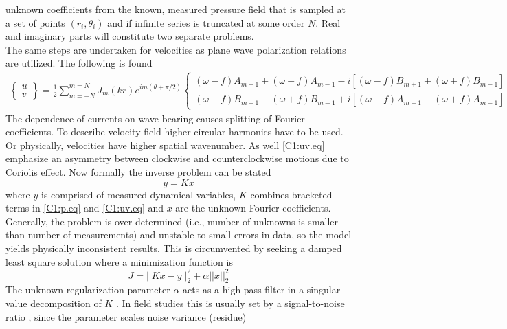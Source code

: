 \documentclass[12pt]{article}
\begin{document}
unknown coefficients from the known, measured pressure field that is sampled at a set of points 
$(r_i, \theta_i)$ and if infinite series is truncated at some order $N$. Real and imaginary parts 
will constitute two separate problems.\\
The same steps are undertaken for velocities as plane wave polarization relations 
\citep[e.g.,][]{muller2000scattering} are utilized. The following is found
\begin{align}
\label{C1:uv.eq}
\begin{Bmatrix}
u \\ v
\end{Bmatrix}
= \frac{1}{2} \sum_{m = -N}^{m = N} J_{m} (kr) e^{im(\theta + \pi/2)}
\begin{Bmatrix}
(\omega - f) A_{m + 1} + (\omega + f) A_{m - 1} - i [(\omega - f) B_{m + 1} + (\omega + f) B_{m - 
	1}] \\ 
(\omega - f) B_{m + 1} - (\omega + f) B_{m - 1} + i [ (\omega - f) A_{m + 1} - (\omega + f) A_{m - 
	1}]
\end{Bmatrix}
\end{align}
The dependence of currents on wave bearing causes splitting of Fourier coefficients. To describe 
velocity field higher circular harmonics have to be used. Or physically, velocities have higher 
spatial wavenumber. As well \eqref{C1:uv.eq} emphasize an asymmetry between clockwise 
and counterclockwise motions due to Coriolis effect. Now formally the inverse problem can be stated 
\begin{equation}
y = K x
\end{equation}
where $y$ is comprised of measured dynamical variables, $K$ combines bracketed terms in 
\eqref{C1:p.eq} and \eqref{C1:uv.eq} and $x$ are the unknown Fourier coefficients. Generally, the 
problem is over-determined (i.e., number of unknowns is smaller than number of 
measurements) and unstable to small errors in data, so the model yields physically inconsistent 
results. This is circumvented by seeking a damped least square solution \citep{munk2009ocean} where 
a minimization function is 
\begin{equation}
\label{C1:Tikh_prob}
J = ||K x - y||^2_2 + \alpha ||x||^2_2
\end{equation}
The unknown regularization parameter $\alpha$ acts as a high-pass filter in a singular value 
decomposition of $K$ \citep{bennett1992inverse}. In field studies this is usually set by a 
signal-to-noise ratio \citep{munk2009ocean}, since the parameter scales noise variance (residue) 
\end{document}
